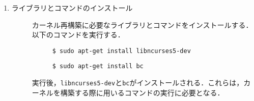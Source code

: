 \documentclass[12pt]{jsarticle}
\begin{document}
\begin{enumerate}
\begin{description}
  \end{description}
\item ライブラリとコマンドのインストール
  \begin{description}
  \item[] カーネル再構築に必要なライブラリとコマンドをインストールする．以下のコマンドを実行する．
    \begin{description}
    \item[] \verb|$ sudo apt-get install libncurses5-dev|
    \item[] \verb|$ sudo apt-get install bc |
    \end{description}
  \item[] 実行後，\verb|libncurses5-dev|と\verb|bc|がインストールされる．これらは，カーネルを構築する際に用いるコマンドの実行に必要となる．
  \end{description}
\end{enumerate}
\end{document}
